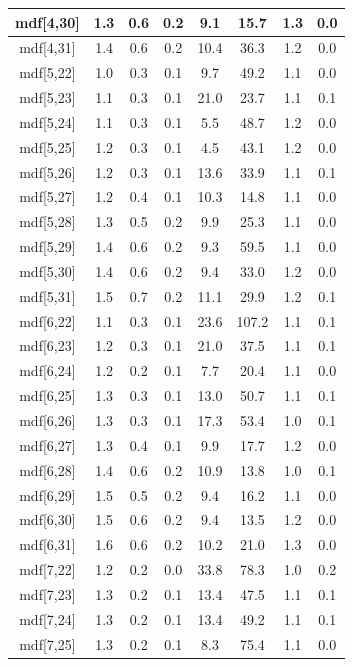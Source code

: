 \begin{longtable}{|c|c|c|c|c|c|c|c|}
\hline
mdf[4,30] & 1.3 & 0.6 & 0.2 & 9.1 & 15.7 & 1.3 & 0.0 \\
\hline
mdf[4,31] & 1.4 & 0.6 & 0.2 & 10.4 & 36.3 & 1.2 & 0.0 \\
\hline
mdf[5,22] & 1.0 & 0.3 & 0.1 & 9.7 & 49.2 & 1.1 & 0.0 \\
\hline
mdf[5,23] & 1.1 & 0.3 & 0.1 & 21.0 & 23.7 & 1.1 & 0.1 \\
\hline
mdf[5,24] & 1.1 & 0.3 & 0.1 & 5.5 & 48.7 & 1.2 & 0.0 \\
\hline
mdf[5,25] & 1.2 & 0.3 & 0.1 & 4.5 & 43.1 & 1.2 & 0.0 \\
\hline
mdf[5,26] & 1.2 & 0.3 & 0.1 & 13.6 & 33.9 & 1.1 & 0.1 \\
\hline
mdf[5,27] & 1.2 & 0.4 & 0.1 & 10.3 & 14.8 & 1.1 & 0.0 \\
\hline
mdf[5,28] & 1.3 & 0.5 & 0.2 & 9.9 & 25.3 & 1.1 & 0.0 \\
\hline
mdf[5,29] & 1.4 & 0.6 & 0.2 & 9.3 & 59.5 & 1.1 & 0.0 \\
\hline
mdf[5,30] & 1.4 & 0.6 & 0.2 & 9.4 & 33.0 & 1.2 & 0.0 \\
\hline
mdf[5,31] & 1.5 & 0.7 & 0.2 & 11.1 & 29.9 & 1.2 & 0.1 \\
\hline
mdf[6,22] & 1.1 & 0.3 & 0.1 & 23.6 & 107.2 & 1.1 & 0.1 \\
\hline
mdf[6,23] & 1.2 & 0.3 & 0.1 & 21.0 & 37.5 & 1.1 & 0.1 \\
\hline
mdf[6,24] & 1.2 & 0.2 & 0.1 & 7.7 & 20.4 & 1.1 & 0.0 \\
\hline
mdf[6,25] & 1.3 & 0.3 & 0.1 & 13.0 & 50.7 & 1.1 & 0.1 \\
\hline
mdf[6,26] & 1.3 & 0.3 & 0.1 & 17.3 & 53.4 & 1.0 & 0.1 \\
\hline
mdf[6,27] & 1.3 & 0.4 & 0.1 & 9.9 & 17.7 & 1.2 & 0.0 \\
\hline
mdf[6,28] & 1.4 & 0.6 & 0.2 & 10.9 & 13.8 & 1.0 & 0.1 \\
\hline
mdf[6,29] & 1.5 & 0.5 & 0.2 & 9.4 & 16.2 & 1.1 & 0.0 \\
\hline
mdf[6,30] & 1.5 & 0.6 & 0.2 & 9.4 & 13.5 & 1.2 & 0.0 \\
\hline
mdf[6,31] & 1.6 & 0.6 & 0.2 & 10.2 & 21.0 & 1.3 & 0.0 \\
\hline
mdf[7,22] & 1.2 & 0.2 & 0.0 & 33.8 & 78.3 & 1.0 & 0.2 \\
\hline
mdf[7,23] & 1.3 & 0.2 & 0.1 & 13.4 & 47.5 & 1.1 & 0.1 \\
\hline
mdf[7,24] & 1.3 & 0.2 & 0.1 & 13.4 & 49.2 & 1.1 & 0.1 \\
\hline
mdf[7,25] & 1.3 & 0.2 & 0.1 & 8.3 & 75.4 & 1.1 & 0.0 \\

\end{longtable}
